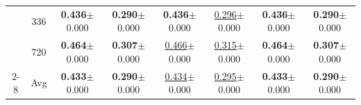 \begin{table}[t]
{\begin{tabular}{c|c|cc|cc|cc}
 & 336 & \textbf{0.436}{\scriptsize$\pm$0.000} & \textbf{0.290}{\scriptsize$\pm$0.000} & \textbf{0.436}{\scriptsize$\pm$0.000} & \underline{0.296}{\scriptsize$\pm$0.000} & \textbf{0.436}{\scriptsize$\pm$0.000} & \textbf{0.290}{\scriptsize$\pm$0.000} \\
 & 720 & \textbf{0.464}{\scriptsize$\pm$0.000} & \textbf{0.307}{\scriptsize$\pm$0.000} & \underline{0.466}{\scriptsize$\pm$0.000} & \underline{0.315}{\scriptsize$\pm$0.000} & \textbf{0.464}{\scriptsize$\pm$0.000} & \textbf{0.307}{\scriptsize$\pm$0.000} \\
\cmidrule(lr){2-8}
 & Avg & \textbf{0.433}{\scriptsize$\pm$0.000} & \textbf{0.290}{\scriptsize$\pm$0.000} & \underline{0.434}{\scriptsize$\pm$0.000} & \underline{0.295}{\scriptsize$\pm$0.000} & \textbf{0.433}{\scriptsize$\pm$0.000} & \textbf{0.290}{\scriptsize$\pm$0.000} \\
\bottomrule
\end{tabular}
}
\end{table}
